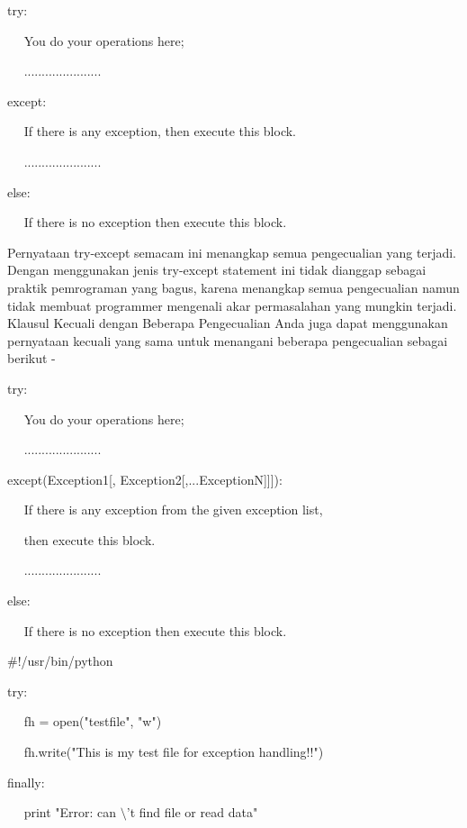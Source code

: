 try: 

~~ You do your operations here; 

~~ ...................... 

except:

~~ If there is any exception, then execute this block. 

~~ ...................... 

else: 

~~ If there is no exception then execute this block.  
\vspace{12pt}
\vspace{16pt}

 \hspace*{0.5in} Pernyataan try-except semacam ini menangkap semua pengecualian yang terjadi. Dengan menggunakan jenis try-except statement ini tidak dianggap sebagai praktik pemrograman yang bagus, karena menangkap semua pengecualian namun tidak membuat programmer mengenali akar permasalahan yang mungkin terjadi. Klausul Kecuali dengan Beberapa Pengecualian Anda juga dapat menggunakan pernyataan kecuali yang sama untuk menangani beberapa pengecualian sebagai berikut - 
\vspace{12pt}
 
try: 

~~ You do your operations here; 

~~ ...................... 

except(Exception1[, Exception2[,...ExceptionN]]]): 

~~ If there is any exception from the given exception list,  

~~ then execute this block. 

~~ ...................... 

else: 

~~ If there is no exception then execute this block.  
\vspace{12pt}
\vspace{12pt}
 
 $  \#  $!/usr/bin/python 
\vspace{12pt}

try: 

~~ fh = open("testfile", "w") 

~~ fh.write("This is my test file for exception handling!!") 
 
finally: 

~~ print "Error: can $  \setminus  $'t find file or read data" 
\vspace{12pt}
\vspace{12pt}
 
